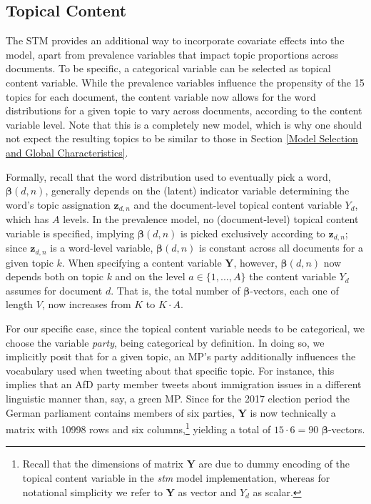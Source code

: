 \subsection{Topical Content}
\label{Topical Content}

The STM provides an additional way to incorporate covariate effects into the model, apart from prevalence variables that impact topic proportions across documents. To be specific, a categorical variable can be selected as topical content variable. While the prevalence variables influence the propensity of the 15 topics for each document, the content variable now allows for the word distributions for a given topic to vary across documents, according to the content variable level. Note that this is a completely new model, which is why one should not expect the resulting topics to be similar to those in Section \ref{Model Selection and Global Characteristics}.

Formally, recall that the word distribution used to eventually pick a word, $\boldsymbol{\beta}(d,n)$, generally depends on the (latent) indicator variable determining the word's topic assignation $\boldsymbol{z}_{d,n}$ and the document-level topical content variable $Y_{d}$, which has $A$ levels. In the prevalence model, no (document-level) topical content variable is specified, implying $\boldsymbol{\beta}(d,n)$ is picked exclusively according to $\boldsymbol{z}_{d,n}$; since $\boldsymbol{z}_{d,n}$ is a word-level variable, $\boldsymbol{\beta}(d,n)$ is constant across all documents for a given topic $k$. When specifying a content variable $\boldsymbol{Y}$, however, $\boldsymbol{\beta}(d,n)$ now depends both on topic $k$ and on the level $a \in \{1, ..., A\}$ the content variable $Y_d$ assumes for document $d$. That is, the total number of $\boldsymbol{\beta}$-vectors, each one of length $V$, now increases from $K$ to $K \cdot A$.

For our specific case, since the topical content variable needs to be categorical, we choose the variable \textit{party}, being categorical by definition. In doing so, we implicitly posit that for a given topic, an MP's party additionally influences the vocabulary used when tweeting about that specific topic. For instance, this implies that an AfD party member tweets about immigration issues in a different linguistic manner than, say, a green MP. Since for the 2017 election period the German parliament contains members of six parties, $\boldsymbol{Y}$ is now technically a matrix with 10998 rows and six columns,\footnote{Recall that the dimensions of matrix $\boldsymbol{Y}$ are due to dummy encoding of the topical content variable in the \textit{stm} model implementation, whereas for notational simplicity we refer to $\boldsymbol{Y}$ as vector and $Y_d$ as scalar.} yielding a total of $15 \cdot 6 = 90$ $\boldsymbol{\beta}$-vectors.

